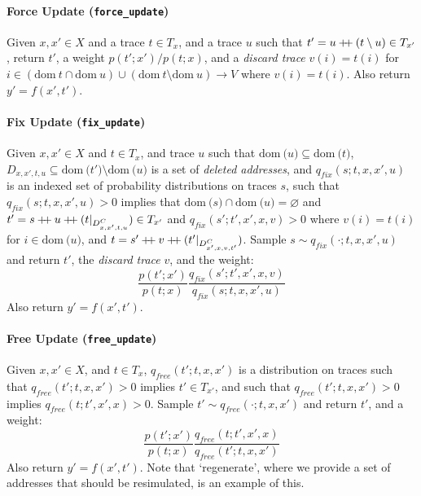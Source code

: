 \documentclass{article}
\newcommand{\code}[1]{\texttt{\small{\textbf{#1}}}}
\newcommand\doubleplus{\mathbin{+\mkern-5mu+}}
\newcommand{\concat}[0]{\doubleplus}
\newcommand{\dom}[1]{\mbox{dom}{~#1}}
\begin{document}

\paragraph{Force Update (\code{force\_update})}
Given $x, x' \in X$ and a trace $t \in T_x$, and a trace $u$ such that $t' = u \concat (t \setminus u) \in T_{x'}$, return $t'$, a weight $p(t'; x') / p(t; x)$, and a \emph{discard trace} $v(i) = t(i)$ for $i \in (\dom{t} \cap \dom{u}) \cup (\dom{t} \setminus \dom{u}) \to V$ where $v(i) = t(i)$.
Also return $y' = f(x', t')$.

\paragraph{Fix Update (\code{fix\_update})}
Given $x, x' \in X$ and $t \in T_x$, and trace $u$ such that $\dom(u) \subseteq \dom(t)$, $D_{x,x',t,u} \subseteq \dom(t') \setminus \dom(u)$ is a set of \emph{deleted addresses}, and $q_{fix}(s; t, x, x', u)$ is an indexed set of probability distributions on traces $s$, such that $q_{fix}(s; t, x, x', u) > 0$ implies that $\dom(s) \cap \dom(u) = \varnothing$ and $t' = s \concat u \concat (t|_{D_{x,x',t,u}^C}) \in T_{x'}$ and $q_{fix}(s'; t', x', x, v) > 0$ where $v(i) = t(i)$ for $i \in \dom(u)$, and $t = s' \concat v \concat (t' |_{D_{x',x,v,t'}^C})$.
Sample $s \sim q_{fix}(\cdot; t, x, x', u)$ and return $t'$, the \emph{discard trace} $v$, and the weight:
\[
\frac{p(t'; x')}{p(t; x)} \frac{q_{fix}(s'; t', x', x, v)}{q_{fix}(s; t, x, x', u)}
\]
Also return $y' = f(x', t')$.

\paragraph{Free Update (\code{free\_update})}
Given $x, x' \in X$, and $t \in T_x$, $q_{free}(t'; t, x, x')$ is a distribution on traces such that $q_{free}(t'; t, x, x') > 0$ implies $t' \in T_{x'}$, and such that $q_{free}(t'; t, x, x') > 0$ implies $q_{free}(t; t', x', x) > 0$.
Sample $t' \sim q_{free}(\cdot; t, x, x')$ and return $t'$, and a weight:
\[
    \frac{p(t'; x')}{p(t; x)} \frac{q_{free}(t; t', x', x)}{q_{free}(t'; t, x, x')}
\]
Also return $y' = f(x', t')$.
Note that `regenerate', where we provide a set of addresses that should be resimulated, is an example of this.
\end{document}
